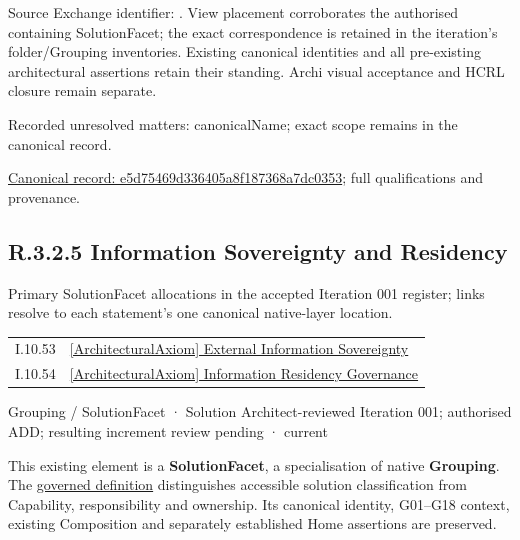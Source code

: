 Source Exchange identifier: \texttt{}. View placement corroborates
the authorised containing SolutionFacet; the exact correspondence is retained in the
iteration's folder/Grouping inventories. Existing canonical identities and all
pre-existing architectural assertions retain their standing. Archi visual
acceptance and HCRL closure remain separate.


{\small Recorded unresolved matters: canonicalName; exact scope remains in the canonical record.}\par
{\footnotesize \href{../../../../../../../continuum/grouping/e5d75469d336405a8f187368a7dc0353.md}{Canonical record: e5d75469d336405a8f187368a7dc0353}; full qualifications and provenance.}\par
\subsection*{R.3.2.5 Information Sovereignty and Residency}
\label{navigation:R.3.2.5}

Primary SolutionFacet allocations in the accepted Iteration 001 register; links resolve to each statement’s one canonical native-layer location.\par
\begin{longtable}{p{.22\linewidth}p{.73\linewidth}}
I.10.53 & \hyperref[element:aa179ef5bdf44b4eab3f2c855a8798d2]{[ArchitecturalAxiom] External Information Sovereignty} \\
I.10.54 & \hyperref[element:349f526a401e4e299b854cbfedad0fca]{[ArchitecturalAxiom] Information Residency Governance} \\
\end{longtable}
\label{element:f4af2b5206264a6fa4c5040324ad272c}
{\small Grouping / SolutionFacet · Solution Architect-reviewed Iteration 001; authorised ADD; resulting increment review pending · current}\par

This existing element is a \textbf{SolutionFacet}, a specialisation of native
\textbf{Grouping}. The \href{\detokenize{../../../../../../../governance/continuum-representation.md#solutionfacet-classification--1119-candidate}}{governed definition}
distinguishes accessible solution classification from Capability, responsibility
and ownership. Its canonical identity, G01–G18 context, existing Composition
and separately established Home assertions are preserved.



